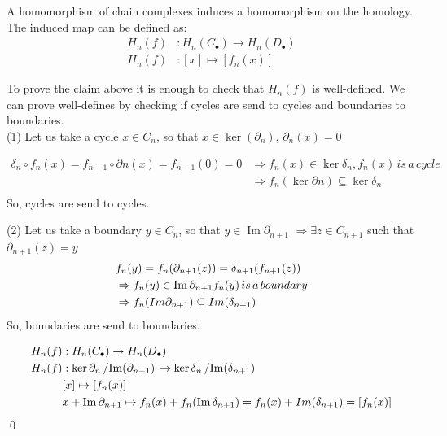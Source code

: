 \documentclass[11pt,a4paper]{report}
\DeclareMathOperator{\Ima}{Im}
\begin{document}
                A homomorphism of chain complexes induces a homomorphism on the homology.
                The induced map can be defined as:
               \begin{align*}
                  H_n(f) &:  H_n(C_\bullet) \rightarrow H_n(D_\bullet)  \\
                  H_n(f) &: [x] \mapsto [f_n(x)]
                \end{align*}

                To prove the claim above it is enough to check that $H_n(f)$ is well-defined.
                We can prove well-defines by checking if cycles are send to cycles and boundaries to boundaries. \\

                (1) Let us take a cycle $x \in C_n$, so that $x \in \ker (\partial_n)$, $\partial_n(x) = 0$

                    \begin{align*}
                        \delta_n \circ f_n(x) = f_{n-1} \circ \partial n(x) = f_{n-1}(0) = 0
                        &\Rightarrow f_n(x) \in \ker \delta_n , f_n(x) \, is \, a \, cycle \\
                        &\Rightarrow f_n(\ker \partial n) \subseteq \ker \delta_n \\
                    \end{align*}
                So, cycles are send to cycles.

                (2) Let us take a boundary $y \in C_n$, so that $y \in \Ima\partial_{n+1}$
                $\Rightarrow \exists z \in C_{n+1}$ such that $\partial_{n+1}(z) = y$
                \begin{align*}
                  &\null f_n(y) = f_n(\partial_{n+1}(z))  = \delta_{n+1}(f_{n+1}(z)) \\
                  &\null \Rightarrow f_n(y) \in \Ima\partial_{n+1} f_n(y) \, is \, a \, boundary\\
                  &\null \Rightarrow f_n(Im\partial_{n+1}) \subseteq Im(\delta_{n+1})
                \end{align*}
                So, boundaries are send to boundaries.

                \begin{align*}
                   H_n(f) &:  H_n(C_\bullet) \rightarrow H_n(D_\bullet)  \\
                   H_n(f) &:  \ker{\partial_n} \left/ \Ima(\partial_{n+1}) \right. \rightarrow \ker{\delta_n} \left/ \Ima(\delta_{n+1}) \right. \\
                             & [x] \mapsto [f_n(x)] \\
                             & x + \Ima\partial_{n+1} \mapsto f_n(x) + f_n(\Ima\delta_{n+1}) =  f_n(x) + Im(\delta_{n+1}) = [f_n(x)]
                \end{align*} \qed
\end{document}
